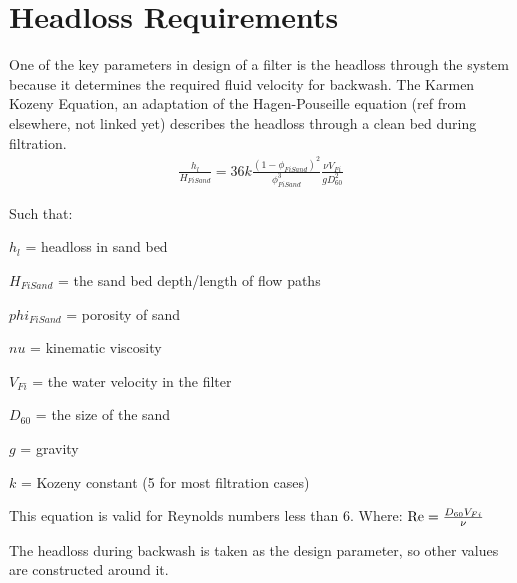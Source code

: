 \documentclass[letterpaper,10pt,english]{sphinxmanual}
\begin{document}
\section{Headloss Requirements}
\label{\detokenize{Filtration/Filtration_Design:headloss-requirements}}\label{\detokenize{Filtration/Filtration_Design:heading-headloss-requirements}}
One of the key parameters in design of a filter is the headloss through the system because it determines the required fluid velocity for backwash. The Karmen Kozeny Equation, an adaptation of the Hagen-Pouseille equation (ref from elsewhere, not linked yet) describes the headloss through a clean bed during filtration.
\begin{equation}\label{equation:Filtration/Filtration_Design:karmen_kozeny_clean_bed}
\begin{split} \frac{h_l}{H_{FiSand}} = 36 k \frac{\left( 1 - \phi_{FiSand} \right)^2}{\phi_{FiSand}^3} \frac{\nu V_{Fi}}{g D_{60}^2}\end{split}
\end{equation}
\begin{DUlineblock}{0em}
\item[] Such that:
\item[] \(h_l\) = headloss in sand bed
\item[] \(H_{FiSand}\) = the sand bed depth/length of flow paths
\item[] \(phi_{FiSand}\) = porosity of sand
\item[] \(nu\) = kinematic viscosity
\item[] \(V_{Fi}\) = the water velocity in the filter
\item[] \(D_{60}\) = the size of the sand
\item[] \(g\) = gravity
\item[] \(k\) = Kozeny constant (5 for most filtration cases)
\end{DUlineblock}

This equation is valid for Reynolds numbers less than 6. Where:
\({\rm Re}  = \frac{D_{60} V_{Fi}}{\nu}\)

The headloss during backwash is taken as the design parameter, so other values are constructed around it.
\end{document}
